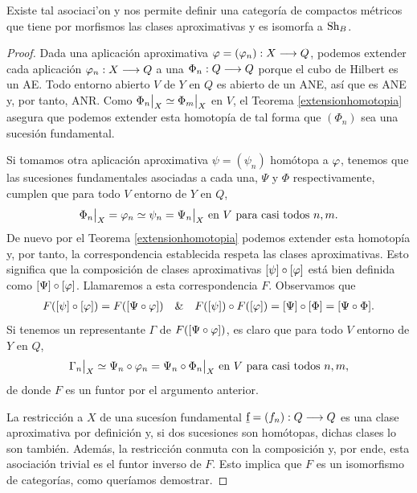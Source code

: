 \begin{theorem}
  Existe tal asociaci'on y nos permite definir una categoría de compactos métricos que tiene por morfismos las clases aproximativas y es isomorfa a $ \operatorname{Sh}_B  $.
\end{theorem}
\begin{proof}
  Dada una aplicación aproximativa $ \varphi = (\varphi_n):X\longrightarrow Q  $, podemos extender cada aplicación $ \varphi_n:X\longrightarrow Q  $ a una $ \Phi_n:Q\longrightarrow Q  $ porque el cubo de Hilbert es un AE. Todo entorno abierto $ V $ de $ Y  $ en $ Q  $ es abierto de un ANE, así que es ANE y, por tanto, ANR. Como $ \rest{\Phi_n}{X} \simeq \rest{\Phi_m}{X} $ en $ V  $, el Teorema \ref{extensionhomotopia} asegura que podemos extender esta homotopía de tal forma que $ (\Phi_n) $ sea una sucesión fundamental.

  Si tomamos otra aplicación aproximativa $ \psi = (\psi_n) $ homótopa a $ \varphi  $, tenemos que las sucesiones fundamentales asociadas a cada una, $ \Psi  $ y $ \Phi  $ respectivamente, cumplen que para todo $ V $ entorno de $ Y  $ en $ Q  $,
  \begin{gather*}
    \rest{\Phi_n }{X } = \vf_n \simeq \psi_n  = \rest{\Psi_n }{X} \text{ en } V \text{ para casi todos } n,m .
  \end{gather*}
  De nuevo por el Teorema \ref{extensionhomotopia} podemos extender esta homotopía y, por tanto, la correspondencia establecida respeta las clases aproximativas. Esto significa que la composición de clases aproximativas $ [\psi]\circ [\varphi ] $ está bien definida como $ [\Psi]\circ [ \varphi ] $. Llamaremos a esta correspondencia $ F  $. Observamos que 
  \begin{gather*}
    F([\psi]\circ [\varphi]) = F([\Psi \circ \varphi])  \quad  \& \quad F([\psi])\circ F([\varphi]) = [\Psi]\circ [\Phi ] = [\Psi \circ \Phi ]. 
  \end{gather*}
  Si tenemos un representante $ \Gamma  $ de $ F([\Psi \circ \varphi]) $, es claro que para todo $ V  $ entorno de $ Y  $ en $ Q  $,
  \begin{gather*}
    \rest{\Gamma_n }{X} \simeq \Psi_n \circ \vf_n  = \rest{\Psi_n\circ \Phi _n}{X} \text{ en } V \text{ para casi todos } n,m,
  \end{gather*}
  de donde $ F  $ es un funtor por el argumento anterior. 

  La restricción a $ X  $ de una sucesíon fundamental $ \underbar{f} = (f_n):Q\longrightarrow Q  $ es una clase aproximativa por definición y, si dos sucesiones son homótopas, dichas clases lo son también. Además, la restricción conmuta con la composición y, por ende, esta asociación trivial es el funtor inverso de $ F  $. Esto implica que $ F  $ es un isomorfismo de categorías, como queríamos demostrar.
\end{proof}


